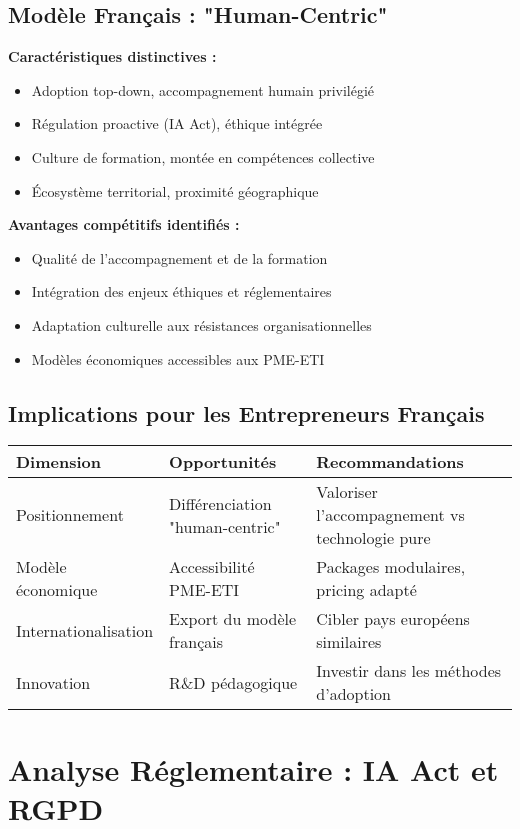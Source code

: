 \subsection{Modèle Français : "Human-Centric"}

\textbf{Caractéristiques distinctives :}
\begin{itemize}
    \item Adoption top-down, accompagnement humain privilégié
    \item Régulation proactive (IA Act), éthique intégrée
    \item Culture de formation, montée en compétences collective
    \item Écosystème territorial, proximité géographique
\end{itemize}

\textbf{Avantages compétitifs identifiés :}
\begin{itemize}
    \item Qualité de l'accompagnement et de la formation
    \item Intégration des enjeux éthiques et réglementaires
    \item Adaptation culturelle aux résistances organisationnelles
    \item Modèles économiques accessibles aux PME-ETI
\end{itemize}

\subsection{Implications pour les Entrepreneurs Français}

\begin{longtable}{@{}p{4cm}p{5cm}p{5cm}@{}}
\toprule
\textbf{Dimension} & \textbf{Opportunités} & \textbf{Recommandations} \\
\midrule
Positionnement & Différenciation "human-centric" & Valoriser l'accompagnement vs technologie pure \\
Modèle économique & Accessibilité PME-ETI & Packages modulaires, pricing adapté \\
Internationalisation & Export du modèle français & Cibler pays européens similaires \\
Innovation & R\&D pédagogique & Investir dans les méthodes d'adoption \\
\bottomrule
\end{longtable}

\section{Analyse Réglementaire : IA Act et RGPD}

